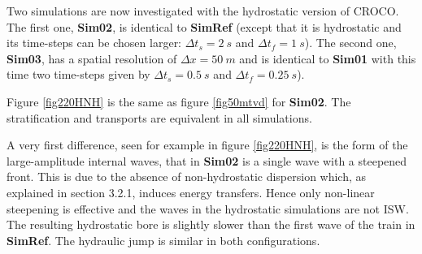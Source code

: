 \documentclass[a4paper,12pt]{article}
\begin{document}
 Two simulations are now investigated with the hydrostatic version of CROCO. The first one, \textbf{Sim02}, is identical to \textbf{SimRef} (except that it is hydrostatic and its time-steps can be chosen larger: $\Delta t_s = 2\ s$ and $\Delta t_f = 1\ s$). The second one, \textbf{Sim03}, has a spatial resolution of $\Delta x = 50\ m$ and is identical to \textbf{Sim01} with this time two time-steps given by $\Delta t_s = 0.5\ s$ and $\Delta t_f = 0.25\ s$).

 Figure \ref{fig220HNH} %
 is the same as figure \ref{fig50mtvd}%
 for \textbf{Sim02}. The stratification and transports are equivalent in all simulations.
 
  

 
 A very first difference, seen for example in figure \ref{fig220HNH}, is the form of the large-amplitude internal waves, that in \textbf{Sim02} is a single wave with a steepened front. This is due to the absence of non-hydrostatic dispersion which, as explained in section 3.2.1, induces energy transfers. Hence only non-linear steepening is effective and the waves in the hydrostatic simulations are not ISW. The resulting hydrostatic bore is slightly slower than the first wave of the train in \textbf{SimRef}. The hydraulic jump is similar in both configurations.
 
\end{document}
